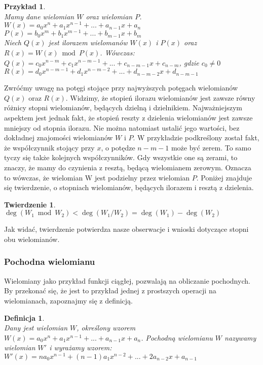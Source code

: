\documentclass[oneside,a4paper]{book}
\newtheorem{theorem}{Twierdzenie}
\newtheorem{definition}{Definicja}
\newtheorem{example}{Przykład}
\begin{document}
	\begin{example}
		$ $\\
		Mamy dane wielomian $W$ oraz wielomian $P$. \\
		$W(x) = a_0x^n + a_1x^{n-1} + ... + a_{n-1}x + a_n$ \\
		$P(x) = b_0x^m + b_1x^{m-1} + ... + b_{m-1}x + b_m$ \\
		Niech $Q(x)$ jest ilorazem wielomanów $W(x)$ i $P(x)$ oraz $R(x) = W(x)\bmod P(x)$. Wówczas: \\
		$Q(x) = c_0x^{n-m} + c_1x^{n-m-1} + ... + c_{n-m-1}x + c_{n-m}$, gdzie $c_0\ne 0$ \\
		$R(x) = d_0x^{n-m-1} + d_1x^{n-m-2} + ... + d_{n-m-2}x + d_{n-m-1}$
	\end{example}
	
	Zwróćmy uwagę na potęgi stojące przy najwyższych potęgach wielomianów $Q(x)$ oraz $R(x)$. Widzimy, że stopień ilorazu wielomianów jest zawsze równy różnicy stopni wielomianów, będących dzielną i dzielnikiem. Najważniejszym aspektem jest jednak fakt, że stopień reszty z dzielenia wielomianów jest zawsze mniejszy od stopnia ilorazu. Nie można natomiast ustalić jego wartości, bez dokładnej znajomości wielomianów $W$ i $P$. W przykładzie podkreślony został fakt, że współczynnik stojący przy $x$, o potędze $n-m-1$ może być zerem. To samo tyczy się także kolejnych współczynników. Gdy wszystkie one są zerami, to znaczy, że mamy do czynienia z resztą, będącą wielomianem zerowym. Oznacza to wówczas, że wielomian W jest podzielny przez wielomian $P$. Poniżej znajduje się twierdzenie, o stopniach wielomianów, będących ilorazem i resztą z dzielenia.
	
	\begin{theorem}
		$ $\\
		$\deg(W_1 \bmod W_2) < \deg(W_1 / W_2) = \deg(W_1) - \deg(W_2)$
	\end{theorem}
	
	Jak widać, twierdzenie potwierdza nasze obserwacje i wnioski dotyczące stopni obu wielomianów.
	
	\subsubsection{Pochodna wielomianu}
	
	Wielomiany jako przykład funkcji ciągłej, pozwalają na obliczanie pochodnych. By przekonać się, że jest to przykład jednej z prostszych operacji na wielomianach, zapoznajmy się z definicją.
	
	\begin{definition}
		$ $\\
		Dany jest wielomian $W$, określony wzorem $W(x) = a_0x^n + a_1x^{n-1} + ... + a_{n-1}x + a_n$. Pochodną wielomianu $W$ nazywamy wielomian $W'$ i wyrażamy wzorem:
		$W'(x) = na_0x^{n-1} + (n-1)a_1x^{n-2} + ... + 2a_{n-2}x + a_{n-1}$
	\end{definition}
	
\end{document}
